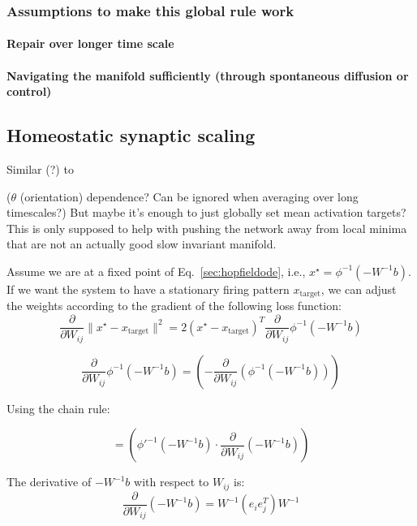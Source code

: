\documentclass{article}
\newcommand{\ascomment}[1]{\textcolor{ascolor}{(#1)}}
\theoremstyle{definition} \newtheorem{definition}{Definition}
\theoremstyle{remark} \newtheorem{remark}{Remark}
\newcounter{ct}
\begin{document}
\subsubsection{Assumptions to make this global rule work}

 
\paragraph{Repair over longer time scale}
 
\paragraph{Navigating the manifold sufficiently (through spontaneous diffusion or control)}


\subsection{Homeostatic synaptic scaling}
Similar (?) to \citep{renart2003robust}

\ascomment{$\theta$ (orientation) dependence? Can be ignored when averaging over long timescales?}
But maybe it's enough to just globally set mean activation targets?
This is only supposed to help with pushing the network away from local minima that are not an actually good slow invariant manifold.



Assume we are at a fixed point of Eq.~\ref{sec:hopfieldode}, i.e., $x^\star = \phi^{-1}(-W^{-1}b)$. %
If we want the system to have a stationary firing pattern $x_{\operatorname{target}}$, we can adjust the weights according to the gradient of the following loss function:
\begin{equation}\label{eq:synscaling_gradient}
\frac{\partial}{\partial W_{ij}} \|x^\star - x_{\operatorname{target}}\|^2 = 2(x^\star - x_{\operatorname{target}})^T\frac{\partial}{\partial W_{ij}} \phi^{-1}(-W^{-1}b)
\end{equation}

\[
 \frac{\partial}{\partial W_{ij}} \phi^{-1}(-W^{-1} b) =   \left( - \frac{\partial}{\partial W_{ij}} \left( \phi^{-1}(-W^{-1} b) \right) \right)
\]

Using the chain rule:

\[
=  \left( \phi'^{-1}(-W^{-1} b) \cdot \frac{\partial}{\partial W_{ij}} \left( -W^{-1} b \right) \right)
\]


The derivative of \( -W^{-1} b \) with respect to \( W_{ij} \) is:
\[
\frac{\partial}{\partial W_{ij}} \left( -W^{-1} b \right) = W^{-1} \left( e_i e_j^T \right) W^{-1}
\]
\end{document}
